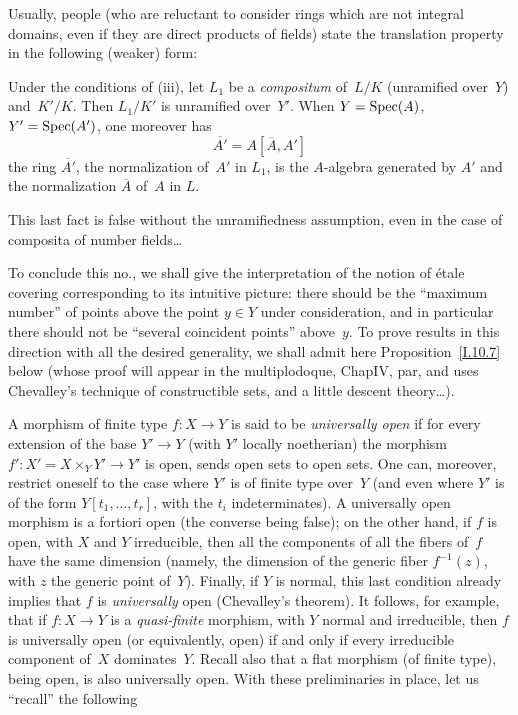 Usually, people (who are reluctant to consider rings
which are not integral domains, even if they are
direct products of fields) state the translation
property in the following (weaker) form:

\begin{corollary}
\label{I.10.6}
Under the conditions of \textup{(iii)}, let $L_1$ be
a \emph{compositum} of~$L/K$ (unramified over~$Y$)
and~$K'/K$. Then $L_1/K'$ is unramified over~$Y'$.
When $Y=\operatorname{Spec}(A)$, $Y'=\operatorname{Spec}(A')$, one moreover has
\[
\overline{A'}=A[\overline{A},A']
\]
\ie the ring $\overline{A'}$, the normalization
of~$A'$ in $L_1$, is the $A$-algebra generated by
$A'$ and the normalization $\overline{A}$ of~$A$
in $L$.
\end{corollary}

This last fact is false without the unramifiedness
assumption, even in the case of composita of number
fields\ldots

To conclude this no., we shall give the interpretation
of the notion of \'etale covering corresponding to
its intuitive picture: there should be the ``maximum
number'' of points above the point $y\in Y$ under
consideration, and in particular there should not be
``several coincident points'' above~$y$. To prove
results in this direction with all the desired
generality, we shall admit here Proposition~\ref{I.10.7}
below (whose proof will appear in the multiplodoque,
Chap\ptbl IV, par, and uses Chevalley's
technique of constructible sets, and a little descent
theory\ldots).

A morphism of finite type $f\colon X\to Y$ is said
to be \emph{universally open} if for every extension
of the base $Y'\to Y$ (with $Y'$ locally noetherian)
the morphism $f'\colon X'=X\times_Y Y'\to Y'$ is
open, \ie sends open sets to open sets. One can,
moreover, restrict oneself to the case where $Y'$
is of finite type over~$Y$ (and even where $Y'$ is
of the form $Y[t_1,\dots,t_r]$, with the $t_i$
indeterminates). A universally open morphism is
a fortiori open (the converse being false);
on the other hand, if $f$ is open, with $X$ and $Y$
irreducible, then all the components of all the
fibers of~$f$ have the same dimension (namely, the
dimension of the generic fiber
$f^{-1}(z)$, with $z$ the generic point of~$Y$).
Finally, if $Y$ is normal, this last condition
already implies that $f$ is \emph{universally} open
(Chevalley's theorem). It follows, for example,
that if $f\colon X\to Y$ is a \emph{quasi-finite}
morphism, with $Y$ normal and irreducible, then $f$
is universally open (or equivalently, open) if and
only if every irreducible component of~$X$ dominates~$Y$.
Recall also that a flat morphism (of finite type),
being open, is also universally open. With these
preliminaries in place, let us ``recall'' the following

